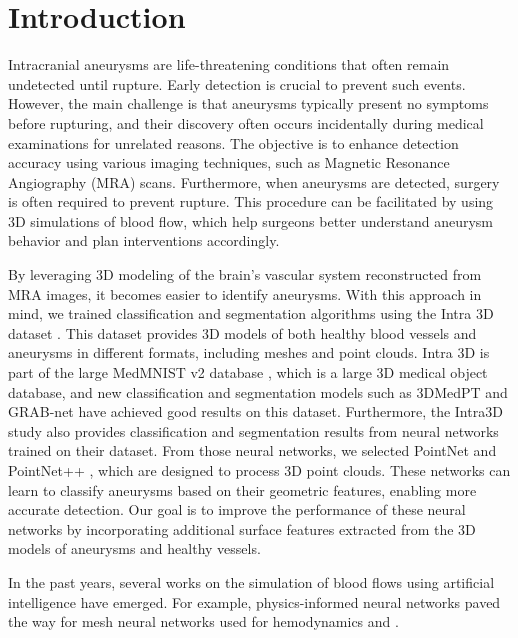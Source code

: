 \documentclass[%
 reprint,
 amsmath,amssymb,
 aps,
 floatfix,
 nofootinbib,
]{revtex4-2}
\begin{document}
\maketitle

\section{Introduction} \label{INTRO}
Intracranial aneurysms are life-threatening conditions that often remain undetected until rupture. Early detection is crucial to prevent such events. However, the main challenge is that aneurysms typically present no symptoms before rupturing, and their discovery often occurs incidentally during medical examinations for unrelated reasons. The objective is to enhance detection accuracy using various imaging techniques, such as Magnetic Resonance Angiography (MRA) scans. Furthermore, when aneurysms are detected, surgery is often required to prevent rupture. This procedure can be facilitated by using 3D simulations of blood flow, which help surgeons better understand aneurysm behavior and plan interventions accordingly.

By leveraging 3D modeling of the brain’s vascular system reconstructed from MRA images, it becomes easier to identify aneurysms. With this approach in mind, we trained classification and segmentation algorithms using the Intra 3D dataset \citep{yang2020intra}. This dataset provides 3D models of both healthy blood vessels and aneurysms in different formats, including meshes and point clouds. Intra 3D is part of the large MedMNIST v2 database \citep{Yang_2023}, which is a large 3D medical object database, and new classification and segmentation models such as 3DMedPT \citep{yu20213dmedicalpointtransformer} and GRAB-net \citep{10093984} have achieved good results on this dataset. Furthermore, the Intra3D study \citep{yang2020intra} also provides classification and segmentation results from neural networks trained on their dataset. From those neural networks, we selected PointNet \citep{pointnet} and PointNet++ \citep{pointnetpp}, which are designed to process 3D point clouds. These networks can learn to classify aneurysms based on their geometric features, enabling more accurate detection. Our goal is to improve the performance of these neural networks by incorporating additional surface features extracted from the 3D models of aneurysms and healthy vessels.

In the past years, several works on the simulation of blood flows using artificial intelligence have emerged. For example, physics-informed neural networks \citep{Arzani_2021} paved the way for mesh neural networks used for hemodynamics \citep{Suk_2024} and \citep{graphphysics}.
\end{document}
